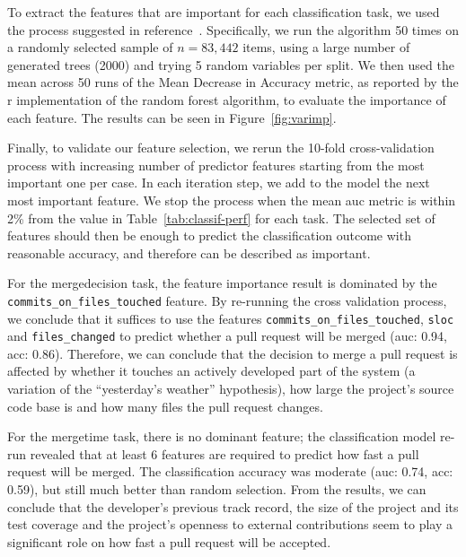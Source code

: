 \documentclass{sig-alternate}
\begin{document}
To extract the features that are important for each classification task, we used
the process suggested in reference~\cite{Genue10}. Specifically, we run the
algorithm 50 times on a randomly selected sample of $n = 83,442$ items, using a
large number of generated trees (2000) and trying 5 random variables per split.
We then used the mean across 50 runs of the  Mean Decrease in Accuracy metric,
as reported by the {\sc r} implementation of the random forest algorithm, to
evaluate the importance of each feature. The results can be seen in
Figure~\ref{fig:varimp}.

Finally, to validate our feature selection, we rerun the 10-fold
cross-validation process with increasing number of predictor features starting
from the most important one per case.  In each iteration step, we add to the
model the next most important feature.  We stop the process when the mean {\sc
auc} metric is within 2\% from the value in Table~\ref{tab:classif-perf} for
each task. The selected set of features should then be enough to predict the
classification outcome with reasonable accuracy, and therefore can be described
as important.

For the \textsf{mergedecision} task, the feature importance result is dominated
by the \texttt{commits\_\-on\_\-files\_\-touched} feature. By re-running the cross
validation process, we conclude that it suffices to use the features
 \texttt{commits\_\-on\_\-files\_\-touched}, \texttt{sloc} and \texttt{files\_changed}
to predict whether a pull request will be merged ({\sc auc:} 0.94, {\sc acc}:
0.86). Therefore, we can conclude that the decision to merge a pull request is
affected by whether it touches an actively developed part of the system (a
variation of the ``yesterday's weather'' hypothesis), how large the project's
source code base is and how many files the pull request changes.


For the \textsf{mergetime} task, there is no dominant feature; the
classification model re-run revealed that at least 6 features are required to
predict how fast a pull request will be merged. The classification accuracy was
moderate ({\sc auc:} 0.74, {\sc acc}: 0.59), but still much better than random
selection. From the results, we can conclude that the developer's previous
track record, the size of the project and its test coverage and the project's
openness to external contributions seem to play a significant role on
how fast a pull request will be accepted.
\end{document}
